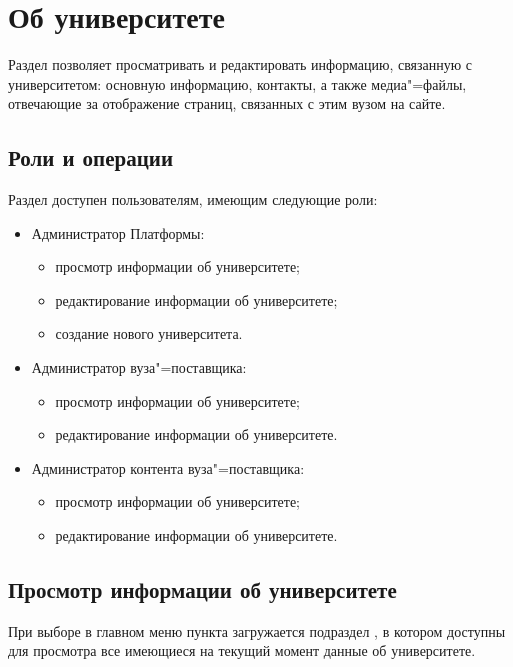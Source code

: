 \graphicspath{{images/university/}}
\section{Об университете}
	Раздел позволяет просматривать и редактировать информацию, связанную с университетом: основную информацию, контакты, а также медиа"=файлы, отвечающие за отображение страниц, связанных с этим вузом на сайте.
	
	\subsection{Роли и операции}
	
	Раздел доступен пользователям, имеющим следующие роли:	

	\begin{itemize}
		\item Администратор Платформы:
		\begin{itemize}
			\item просмотр информации об университете;
			\item редактирование информации об университете;
			\item создание нового университета.
		\end{itemize}
		\item Администратор вуза"=поставщика:
		\begin{itemize}
			\item просмотр информации об университете;
			\item редактирование информации об университете.
		\end{itemize}
		\item Администратор контента вуза"=поставщика:
		\begin{itemize}
			\item просмотр информации об университете;
			\item редактирование информации об университете.
		\end{itemize}
	\end{itemize} 
	
	\subsection{Просмотр информации об университете}\label{university:detail_section}
	При выборе в главном меню пункта  загружается подраздел , в котором доступны для просмотра все имеющиеся на текущий момент данные об университете.

